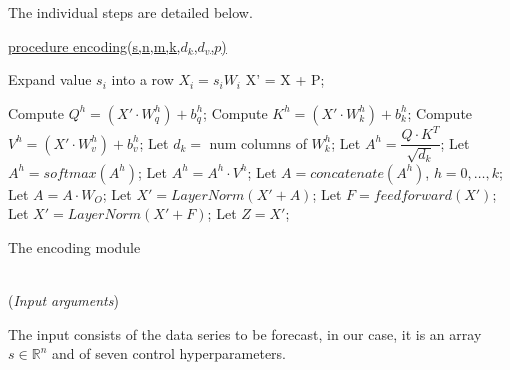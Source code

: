 \documentclass[algorithms,article,submit,pdftex,moreauthors]{Definitions/mdpi}
\begin{document}
The individual steps are detailed below.

\begin{algorithm2e}

        \underline{procedure encoding(s,n,m,k,$d_k$,$d_v$,$p$)} \label{algo:encoding}
        
        
        {\label{enc:seca1}
            Expand value $s_i$ into a row $X_i = s_iW_i$
        }   \label{enc:seca2}
        X' = X + P;\; \label{enc:positional}
        
	{ \label{enc:encoding-block1}
            {	\label{enc:multihead1}
                Compute $Q^h=(X'\cdot W_q^h) + b_q^h$;\; \label{enc:qh}
                Compute $K^h=(X'\cdot W_k^h) + b_k^h$;\; \label{enc:kh}
                Compute $V^h=(X'\cdot W_v^h) + b_v^h$;\; \label{enc:vh}
                Let $d_k=$ num columns of $W^h_k$;\; \label{enc:dk}
                Let $A^h = \dfrac{Q \cdot K^T}{\sqrt{d_k}}$;  \label{enc:attention1}
                Let $A^h = softmax\left(A^h\right)$;  \label{enc:softmax}
                Let $A^h = A^h\cdot V^h$;  \label{enc:attention2}
            } \label{enc:multihead2}
            Let $A=concatenate(A^h)$, $h=0,\dots,k$;\; \label{enc:concatenation}
            Let $A = A \cdot W_O$;  \label{enc:outproj} 
            Let $X' = LayerNorm(X' + A)$;\; \label{enc:addnorm1}
            Let $F = feedforward(X')$;  \label{enc:ffn}
            Let $X' = LayerNorm(X' + F)$;\; \label{enc:addnorm2}
        }   \label{enc:encoding-block2}                  
        Let $Z = X'$; \label{enc:output}
	\caption{The encoding module}
\end{algorithm2e}

~\\(\textit{Input arguments})

The input consists of the data series to be forecast, in our case, it is an array $s \in \mathbb{R}^n$ and of seven control hyperparameters.
\end{document}
